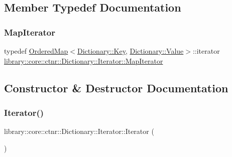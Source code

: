 \subsection{Member Typedef Documentation}
\mbox{\label{classlibrary_1_1core_1_1ctnr_1_1_dictionary_1_1_iterator_a990205e908ac1bafcd754993219b805e}} 
\subsubsection{\texorpdfstring{Map\+Iterator}{MapIterator}}
{\footnotesize\ttfamily typedef \hyperlink{namespacelibrary_1_1core_1_1ctnr_a1c0809231c3bc9fccce602bd7941a36b}{Ordered\+Map}$<$\hyperlink{classlibrary_1_1core_1_1ctnr_1_1_dictionary_a987cae687cce70d81a2a483c5e05e842}{Dictionary\+::\+Key}, \hyperlink{classlibrary_1_1core_1_1ctnr_1_1_dictionary_a3baf6692694e4fc27cb399ac083c88ea}{Dictionary\+::\+Value}$>$\+::iterator \hyperlink{classlibrary_1_1core_1_1ctnr_1_1_dictionary_1_1_iterator_a990205e908ac1bafcd754993219b805e}{library\+::core\+::ctnr\+::\+Dictionary\+::\+Iterator\+::\+Map\+Iterator}}



\subsection{Constructor \& Destructor Documentation}
\mbox{\label{classlibrary_1_1core_1_1ctnr_1_1_dictionary_1_1_iterator_aa058bf5cb2ff90c93bb3de0925483453}} 
\subsubsection{\texorpdfstring{Iterator()}{Iterator()}\hspace{0.1cm}{\footnotesize\ttfamily [1/3]}}
{\footnotesize\ttfamily library\+::core\+::ctnr\+::\+Dictionary\+::\+Iterator\+::\+Iterator (\begin{DoxyParamCaption}{ }\end{DoxyParamCaption})}

